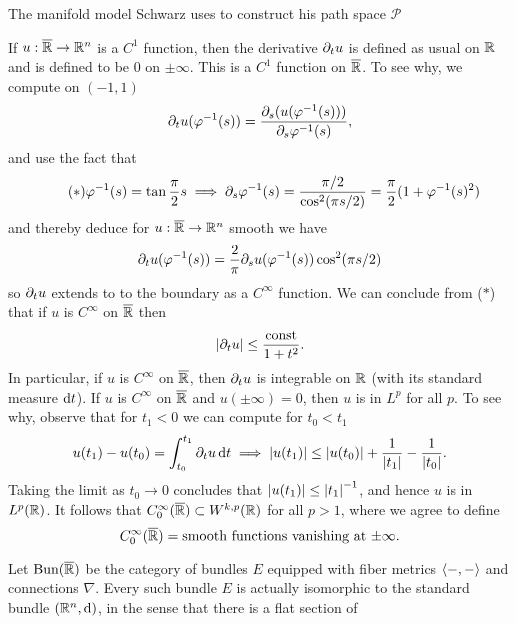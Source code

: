 \documentclass{amsart}
\begin{document}
\begin{clear}{The manifold model Schwarz uses to construct his path
    space $\mathscr{P}$}
\begin{defn}
  If $u:\overline{\mathbb{R}}\to \mathbb{R}^{n}$ is a $C^{1}$ function, then the derivative $\partial_{t}u$ is defined as usual on $\mathbb{R}$ and is defined to be $0$ on $\pm \infty$. This is a $C^{1}$ function on $\overline{\mathbb{R}}$. To see why, we compute on $(-1,1)$
  \begin{equation*}
    \partial_{t}u(\varphi^{-1}(s))=\frac{\partial_{s}(u(\varphi^{-1}(s)))}{\partial_{s}\varphi^{-1}(s)},
  \end{equation*}
  and use the fact that
  \begin{equation*}\tag{$\ast$}
    \varphi^{-1}(s)=\tan\frac{\pi}{2}s\implies \partial_{s}\varphi^{-1}(s)=\frac{\pi/2}{\cos^{2}(\pi s/2)}=\frac{\pi}{2}(1+\varphi^{-1}(s)^{2})
  \end{equation*}
  and thereby deduce for $u:\overline{\mathbb{R}}\to \mathbb{R}^{n}$ smooth we have
  \begin{equation*}
    \partial_{t}u(\varphi^{-1}(s))=\frac{2}{\pi}\partial_{s}u(\varphi^{-1}(s)) \cos^{2}(\pi s/2)
  \end{equation*}
  so $\partial_{t}u$ extends to to the boundary as a $C^{\infty}$ function. We can conclude from ($\ast$) that if $u$ is $C^{\infty}$ on $\overline{\mathbb{R}}$ then
  \begin{equation*}
    \left|\partial_{t}u\right|\le \frac{\text{const}}{1+t^{2}}.
  \end{equation*}
  In particular, if $u$ is $C^{\infty}$ on $\overline{\mathbb{R}}$, then $\partial_{t}u$ is integrable on $\mathbb{R}$ (with its standard measure $\mathrm{d} t$). If $u$ is $C^{\infty}$ on $\overline{\mathbb{R}}$ and $u(\pm\infty)=0$, then $u$ is in $L^{p}$ for all $p$. To see why, observe that for $t_{1}<0$ we can compute for $t_{0}<t_{1}$
  \begin{equation*}
    u(t_{1})-u(t_{0})=\int_{t_{0}}^{t_{1}}\partial_{t}u\,\mathrm{d} t\implies \left|u(t_{1})\right|\le \left|u(t_{0})\right|+\frac{1}{\left|t_{1}\right|}-\frac{1}{\left|t_{0}\right|}.
  \end{equation*}
  Taking the limit as $t_{0}\to 0$ concludes that $\left|u(t_{1})\right|\le \left|t_{1}\right|^{-1}$, and hence $u$ is in $L^{p}(\mathbb{R})$. It follows that $C^{\infty}_{0}(\overline{\mathbb{R}})\subset W^{k,p}(\mathbb{R})$ for all $p>1$, where we agree to define $$C^{\infty}_{0}(\overline{\mathbb{R}})=\text{smooth functions vanishing at $\pm \infty$}.$$
\end{defn}
\begin{defn}
  Let $\text{Bun}(\overline{\mathbb{R}})$ be the category of bundles $E$ equipped with fiber metrics $\left\langle-,-\right\rangle$ and connections $\nabla$. Every such bundle $E$ is actually isomorphic to the standard bundle $(\mathbb{R}^{n},\mathrm{d})$, in the sense that there is a flat section of
  \begin{equation*}

\end{equation*}
\end{defn}
\end{clear}
\end{document}

